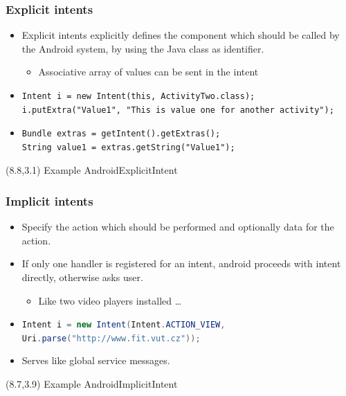 \documentclass[10pt,xcolor=pdflatex]{beamer}
\newcommand{\inlinejava}{\lstinline[language={Java},basicstyle=\ttfamily,keepspaces]}
\begin{document}
\begin{frame}[fragile]\frametitle{Explicit intents}
	\begin{itemize}
    	\footnotesize
		\item Explicit intents explicitly defines the component which should be called by the Android system, by using the Java class as identifier.
          \begin{itemize}
            \item Associative array of values can be sent in the intent
          \end{itemize}
        \bigskip
        \color{red}
        \item[]
        	\lstset{language=Java, basicstyle=\footnotesize\ttfamily}
            \begin{lstlisting}
Intent i = new Intent(this, ActivityTwo.class);
i.putExtra("Value1", "This is value one for another activity");
            \end{lstlisting}
        \item[]
        	\lstset{language=Java, basicstyle=\footnotesize\ttfamily}
            \begin{lstlisting}
Bundle extras = getIntent().getExtras();
String value1 = extras.getString("Value1");
            \end{lstlisting}
	\end{itemize}
\begin{textblock}{15}(8.8,3.1)
    {\footnotesize Example AndroidExplicitIntent}
\end{textblock}
\end{frame}


\begin{frame}[fragile]\frametitle{Implicit intents}
	\def\mezera{.5em}
	\begin{itemize}
		\item Specify the action which should be performed and optionally data for the action.
		\item If only one handler is registered for an intent, android proceeds with intent directly, otherwise asks user.
          \begin{itemize}
			\item {Like two video players installed \ldots}
          \end{itemize}
		\item[] {{\color{red}\inlinejava{Intent i = new Intent(Intent.ACTION_VIEW, Uri.parse("http://www.fit.vut.cz"));}}}
		\item Serves like global service messages.
	\end{itemize}
\begin{textblock}{15}(8.7,3.9)
    {\footnotesize Example AndroidImplicitIntent}
\end{textblock}
\end{frame}
\end{document}
